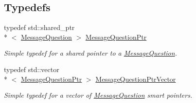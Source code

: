 \subsection*{Typedefs}
\begin{DoxyCompactItemize}
\item 
typedef std\-::shared\-\_\-ptr\\*
$<$ \hyperlink{class_senergy_1_1_dns_1_1_message_question}{Message\-Question} $>$ \hyperlink{namespace_senergy_1_1_dns_a425a2a6f3b5c18973c524a99bdfa4ef0}{Message\-Question\-Ptr}
\begin{DoxyCompactList}\small\item\em Simple typedef for a shared pointer to a \hyperlink{class_senergy_1_1_dns_1_1_message_question}{Message\-Question}. \end{DoxyCompactList}\item 
typedef std\-::vector\\*
$<$ \hyperlink{namespace_senergy_1_1_dns_a425a2a6f3b5c18973c524a99bdfa4ef0}{Message\-Question\-Ptr} $>$ \hyperlink{namespace_senergy_1_1_dns_a76982150ca0b86c08d888f3e3e805747}{Message\-Question\-Ptr\-Vector}
\begin{DoxyCompactList}\small\item\em Simple typedef for a vector of \hyperlink{class_senergy_1_1_dns_1_1_message_question}{Message\-Question} smart pointers. \end{DoxyCompactList}\end{DoxyCompactItemize}
